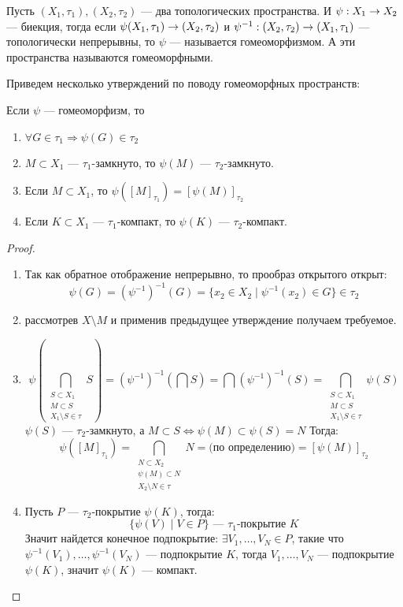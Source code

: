 {\begin{definition}
	Пусть $(X_1, \tau_1), (X_2, \tau_2)$ --- два топологических пространства. И $\psi: X_1 \rightarrow X_2$ --- биекция, тогда если $ \psi (X_1, \tau_1) \rightarrow (X_2, \tau_2)$ и $\psi^{-1}: (X_2, \tau_2) \rightarrow (X_1, \tau_1)$ --- топологически непрерывны, то $\psi$ --- называется гомеоморфизмом. А эти пространства называются гомеоморфными.
\end{definition}
Приведем несколько утверждений по поводу гомеоморфных пространств:
\begin{claim}
	Если $\psi$ --- гомеоморфизм, то 
	\begin{enumerate}
		\item $\forall G \in \tau_1 \Rightarrow \psi(G) \in \tau_2 $
		\item $M \subset X_1$ --- $\tau_1$-замкнуто, то $\psi(M)$ --- $\tau_2$-замкнуто. 
		\item Если $M \subset X_1$, то $\psi\left([M]_{\tau_1}\right) = \left[\psi(M)\right]_{\tau_2}$
		\item Если $K \subset X_1$ --- $\tau_1$-компакт, то $\psi(K)$ --- $\tau_2$-компакт.
	\end{enumerate}
\end{claim}
\begin{proof}
	\begin{enumerate}
		\item Так как обратное отображение непрерывно, то прообраз открытого открыт:
		$$
		\psi(G) = (\psi^{-1})^{-1}(G) = \{x_2 \in X_2 \mid \psi^{-1}(x_2) \in G\} \in \tau_2
		$$
		\item рассмотрев $X \setminus M$ и применив предыдущее утверждение получаем требуемое.
		\item 
		$$
		\psi\left(\bigcap_{
			\substack{
				{S \subset X_1} \\
				{M \subset S } \\
				{X_1\setminus S \in \tau}
			}
		}S\right) = (\psi^{-1})^{-1}\left(\bigcap S\right) = \bigcap (\psi^{-1})^{-1}(S) = \bigcap_{\substack{S \subset X_1 \\ M \subset S \\ X_1\setminus S \in \tau}} \psi(S)
		$$
		$\psi(S)$ --- $\tau_2$-замкнуто, а $M \subset S \Leftrightarrow \psi(M) \subset \psi(S) = N$ Тогда:
		$$
		\psi\left([M]_{\tau_1}\right) = \bigcap_{\substack{N \subset X_2 \\ \psi(M) \subset N \\ X_2\setminus N \in \tau}}N = \text{(по определению)} = \left[\psi(M)\right]_{\tau_2}   
		$$
		\item Пусть $P$ --- $\tau_2$-покрытие $\psi(K)$, тогда:
		$$
		\{\psi(V) \mid V \in P \} \text{ --- $\tau_1$-покрытие $K$}
		$$
		Значит найдется конечное подпокрытие: $\exists V_1, \dots ,V_N \in P$, такие что $\psi^{-1}(V_1), \dots, \psi^{-1}(V_N)$ --- подпокрытие $K$, тогда $V_1, \dots,V_N$ --- подпокрытие $\psi(K)$, значит $\psi(K)$ --- компакт.
	\end{enumerate}
\end{proof}
}
